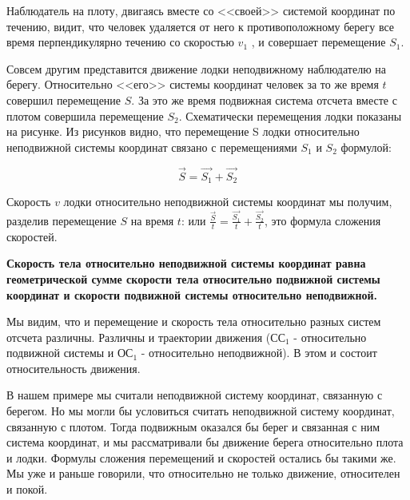 \documentclass[a5paper, 10pt]{diss_4}
\renewcommand{\'}{\,'}
\begin{document}
  Наблюдатель на плоту, двигаясь вместе со <<своей>> системой координат по
течению, видит, что человек удаляется от него к противоположному берегу все
время перпендикулярно течению со скоростью $v_1$ , и совершает перемещение
$S_1$.

  Совсем другим представится движение лодки неподвижному наблюдателю на
берегу. Относительно <<его>> системы координат человек за то же время $t$
совершил перемещение $S$. За это же время подвижная система отсчета вместе с
плотом совершила перемещение $S_2$. Схематически перемещения лодки показаны
на рисунке. Из рисунков видно, что перемещение S лодки относительно
неподвижной системы координат связано с перемещениями $S_1$ и $S_2$ формулой:

\[\vec{S}=\vec{S_1}+\vec{S_2}\]

  Скорость $v$ лодки относительно неподвижной системы координат мы получим,
разделив перемещение $S$ на время $t$: или
$\frac{\vec{S}}{t}=\frac{\vec{S_1}}{t}+\frac{\vec{S_2}}{t}$, это формула
сложения скоростей.

\textbf{  Скорость тела относительно неподвижной системы координат равна
геометрической сумме скорости тела относительно подвижной системы координат и
скорости подвижной системы относительно неподвижной.}

  Мы видим, что и перемещение и скорость тела относительно разных систем
отсчета различны. Различны и траектории движения ($СС_1$ - относительно
подвижной системы и $ОС_1$ - относительно неподвижной). В этом и состоит
относительность движения.

  В нашем примере мы считали неподвижной систему координат, связанную с
берегом. Но мы могли бы условиться считать неподвижной систему координат,
связанную с плотом. Тогда подвижным оказался бы берег и связанная с ним система
координат, и мы рассматривали бы движение берега относительно плота и лодки.
Формулы сложения перемещений и скоростей остались бы такими же. Мы уже и раньше
говорили, что относительно не только движение, относителен и покой.
\end{document}
